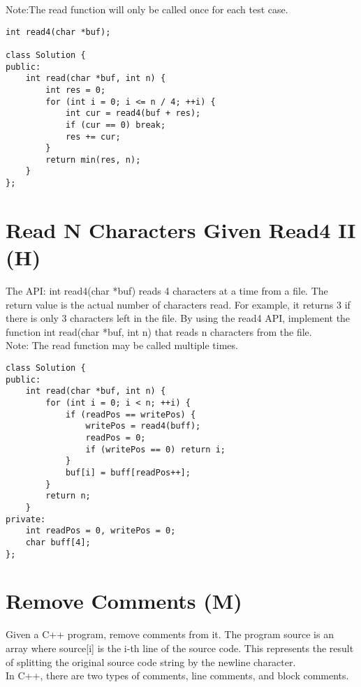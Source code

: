 Note:The read function will only be called once for each test case.\\

\begin{lstlisting}
int read4(char *buf);

class Solution {
public:
    int read(char *buf, int n) {
        int res = 0;
        for (int i = 0; i <= n / 4; ++i) {
            int cur = read4(buf + res);
            if (cur == 0) break;
            res += cur;
        }
        return min(res, n);
    }
};
\end{lstlisting}


\section{Read N Characters Given Read4 II (H)}
The API: int read4(char *buf) reads 4 characters at a time from a file. The return value is the actual number of characters read. For example, it returns 3 if there is only 3 characters left in the file. By using the read4 API, implement the function int read(char *buf, int n) that reads n characters from the file.\\

Note: The read function may be called multiple times. \\

\begin{lstlisting}
class Solution {
public:
    int read(char *buf, int n) {
        for (int i = 0; i < n; ++i) {
            if (readPos == writePos) {
                writePos = read4(buff);
                readPos = 0;
                if (writePos == 0) return i;
            }
            buf[i] = buff[readPos++];
        }
        return n;
    }
private:
    int readPos = 0, writePos = 0;
    char buff[4];
};
\end{lstlisting}

\section{Remove Comments (M)}
Given a C++ program, remove comments from it. The program source is an array where source[i] is the i-th line of the source code. This represents the result of splitting the original source code string by the newline character.\\

In C++, there are two types of comments, line comments, and block comments.\\

